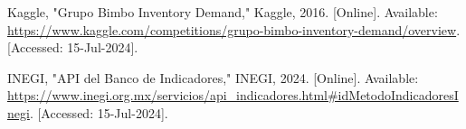 \documentclass[letterpaper, 10 pt, conference]{ieeeconf}  %
\begin{document}






\begin{thebibliography}{99}

 Kaggle, "Grupo Bimbo Inventory Demand," Kaggle, 2016. [Online]. Available: \url{https://www.kaggle.com/competitions/grupo-bimbo-inventory-demand/overview}. [Accessed: 15-Jul-2024].

 INEGI, "API del Banco de Indicadores," INEGI, 2024. [Online]. Available: \url{https://www.inegi.org.mx/servicios/api_indicadores.html#idMetodoIndicadoresInegi}. [Accessed: 15-Jul-2024].

\end{thebibliography}
\end{document}
